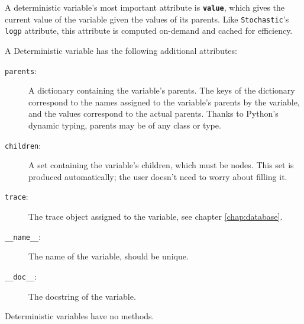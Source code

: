 A deterministic variable's most important attribute is \texttt{\bfseries value}, which gives the current value of the variable given the values of its parents. Like \texttt{Stochastic}'s \texttt{logp} attribute, this attribute is computed on-demand and cached for efficiency.

A Deterministic variable has the following additional attributes:
\begin{description}
    \item[\texttt{parents}:] A dictionary containing the variable's parents. The keys of the dictionary correspond to the names assigned to the variable's parents by the variable, and the values correspond to the actual parents. Thanks to Python's dynamic typing, parents may be of any class or type.
    \item[\texttt{children}:] A set containing the variable's children, which must be nodes. This set is produced automatically; the user doesn't need to worry about filling it.
    \item[\texttt{trace}:] The trace object assigned to the variable, see chapter \ref{chap:database}.
    \item[\texttt{__name__}:] The name of the variable, should be unique.
    \item[\texttt{__doc__}:] The docstring of the variable.
\end{description}
Deterministic variables have no methods.


